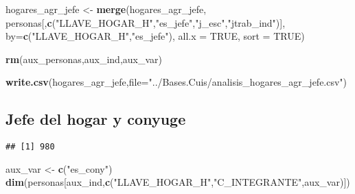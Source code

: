 \documentclass[11pt,]{article}
\newenvironment{Shaded}{\begin{snugshade}}{\end{snugshade}}
\newcommand{\KeywordTok}[1]{\textcolor[rgb]{0.13,0.29,0.53}{\textbf{#1}}}
\newcommand{\DataTypeTok}[1]{\textcolor[rgb]{0.13,0.29,0.53}{#1}}
\newcommand{\DecValTok}[1]{\textcolor[rgb]{0.00,0.00,0.81}{#1}}
\newcommand{\StringTok}[1]{\textcolor[rgb]{0.31,0.60,0.02}{#1}}
\newcommand{\CommentTok}[1]{\textcolor[rgb]{0.56,0.35,0.01}{\textit{#1}}}
\newcommand{\OtherTok}[1]{\textcolor[rgb]{0.56,0.35,0.01}{#1}}
\newcommand{\OperatorTok}[1]{\textcolor[rgb]{0.81,0.36,0.00}{\textbf{#1}}}
\newcommand{\NormalTok}[1]{#1}
\begin{document}
\begin{Shaded}
\begin{Highlighting}[]
\NormalTok{hogares_agr_jefe <-}\StringTok{ }\KeywordTok{merge}\NormalTok{(hogares_agr_jefe,}
\NormalTok{                          personas[,}\KeywordTok{c}\NormalTok{(}\StringTok{"LLAVE_HOGAR_H"}\NormalTok{,}\StringTok{"es_jefe"}\NormalTok{,}\StringTok{"j_esc"}\NormalTok{,}\StringTok{"jtrab_ind"}\NormalTok{)],}
                          \DataTypeTok{by=}\KeywordTok{c}\NormalTok{(}\StringTok{"LLAVE_HOGAR_H"}\NormalTok{,}\StringTok{"es_jefe"}\NormalTok{),}
                          \DataTypeTok{all.x =} \OtherTok{TRUE}\NormalTok{,}
                          \DataTypeTok{sort =} \OtherTok{TRUE}\NormalTok{)}

\KeywordTok{rm}\NormalTok{(aux_personas,aux_ind,aux_var)}

\KeywordTok{write.csv}\NormalTok{(hogares_agr_jefe,}\DataTypeTok{file=}\StringTok{"../Bases.Cuis/analisis_hogares_agr_jefe.csv"}\NormalTok{)}
\end{Highlighting}
\end{Shaded}

\subsection{Jefe del hogar y conyuge}\label{jefe-del-hogar-y-conyuge}

\begin{Shaded}
\end{Shaded}

\begin{verbatim}
## [1] 980
\end{verbatim}

\begin{Shaded}
\begin{Highlighting}[]
\NormalTok{aux_var <-}\StringTok{ }\KeywordTok{c}\NormalTok{(}\StringTok{"es_cony"}\NormalTok{)}
\KeywordTok{dim}\NormalTok{(personas[aux_ind,}\KeywordTok{c}\NormalTok{(}\StringTok{"LLAVE_HOGAR_H"}\NormalTok{,}\StringTok{"C_INTEGRANTE"}\NormalTok{,aux_var)])}
\end{Highlighting}
\end{Shaded}
\end{document}
